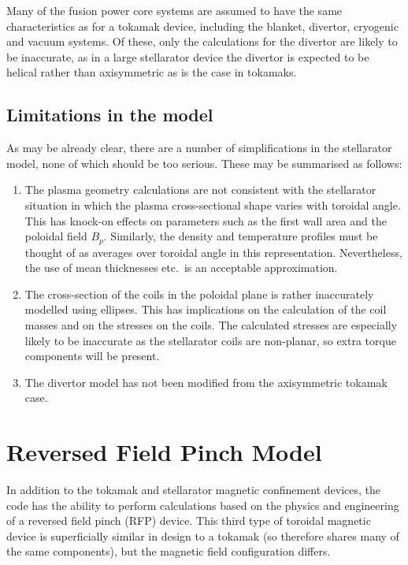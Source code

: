 \documentclass[11pt,a4paper]{report}
\begin{document}
Many of the fusion power core systems are assumed to have the same
characteristics as for a tokamak device, including the blanket, divertor,
cryogenic and vacuum systems. Of these, only the calculations for the divertor
are likely to be inaccurate, as in a large stellarator device the divertor is
expected to be helical rather than axisymmetric as is the case in tokamaks.

\subsection{Limitations in the model}

As may be already clear, there are a number of simplifications in the
stellarator model, none of which should be too serious. These may be
summarised as follows:

\begin{enumerate}

\item The plasma geometry calculations are not consistent with the stellarator
  situation in which the plasma cross-sectional shape varies with toroidal
  angle. This has knock-on effects on parameters such as the first wall area
  and the poloidal field $B_p$. Similarly, the density and temperature
  profiles must be thought of as averages over toroidal angle in this
  representation. Nevertheless, the use of mean thicknesses etc.\ is an
  acceptable approximation.

\item The cross-section of the coils in the poloidal plane is rather
  inaccurately modelled using ellipses. This has implications on the
  calculation of the coil masses and on the stresses on the coils. The
  calculated stresses are especially likely to be inaccurate as the
  stellarator coils are non-planar, so extra torque components will be
  present.

\item The divertor model has not been modified from the axisymmetric tokamak
  case.

\end{enumerate}

\section{Reversed Field Pinch Model}

In addition to the tokamak and stellarator magnetic confinement devices, the
code has the ability to perform calculations based on the physics and
engineering of a reversed field pinch (RFP) device. This third type of
toroidal magnetic device is superficially similar in design to a tokamak (so
therefore shares many of the same components), but the magnetic field
configuration differs.
\end{document}
